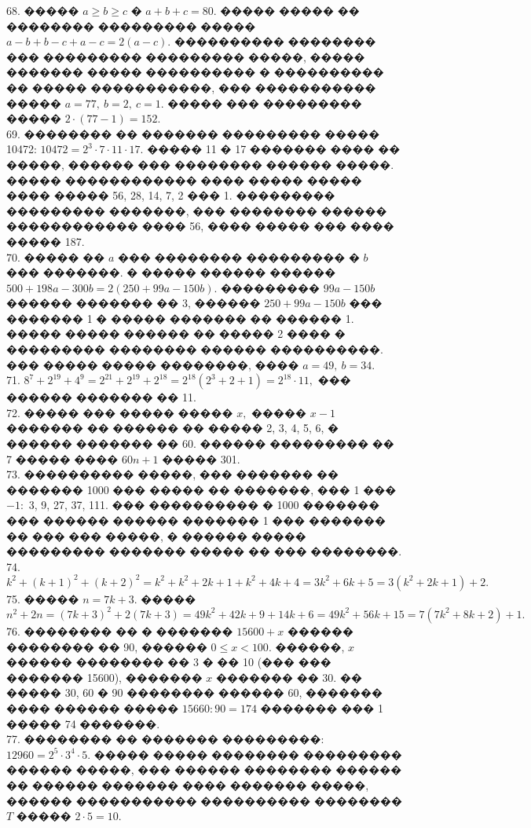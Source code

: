 \documentclass[12pt]{article}
\begin{document}
68. ����� $a\geqslant b\geqslant c$ � $a+b+c=80.$ ����� ����� �� �������� ��������� ����� $a-b+b-c+a-c=2(a-c).$ ���������� �������� ��� ��������� ��������� �����, ����� ������� ����� ���������� � ���������� �� ����� �����������, ��� ����������� ����� $a=77,\ b=2,\ c=1.$ ����� ��� ��������� ����� $2\cdot(77-1)=152.$\\
69. �������� �� ������� ��������� ����� 10472: $10472=2^3\cdot7\cdot11\cdot17.$ ����� 11 � 17 ������� ���� �� �����, ������ ��� �������� ������ �����. ����� ������������ ���� ����� ����� ���� ����� 56, 28, 14, 7, 2 ��� 1. ��������� ��������� �������, ��� �������� ������ ������������ ���� 56, ���� ����� ��� ���� ����� 187.\\
70. ����� �� $a$ ��� �������� ��������� � $b$ ��� �������. � ����� ������ ������ $500+198a-300b=2(250+99a-150b).$ ��������� $99a-150b$ ������ ������� �� 3, ������
$250+99a-150b$ ��� ������� 1 � ����� ������� �� ������ 1. ����� ����� ������ �� ����� 2 ���� � ��������� �������� ������ ����������. ��� ����� ����� ��������, ���� $a=49,\ b=34.$\\
71. $8^7+2^{19}+4^9=2^{21}+2^{19}+2^{18}=2^{18}(2^3+2+1)=2^{18}\cdot11,$ ��� ������ ������� �� 11.\\
72. ����� ��� ����� ����� $x,$ ����� $x-1$ ������� �� ������ �� ����� 2, 3, 4, 5, 6, � ������ ������� �� 60. ������ ��������� �� 7 ����� ���� $60n+1$ ����� 301.\\
73. ���������� �����, ��� ������� �� ������� 1000 ��� ����� �� �������, ��� 1 ��� $-1:$ 3, 9, 27, 37, 111. ��� ���������� � 1000 ������� ��� ������ ������ ������� 1 ��� ������� �� ��� ��� �����, � ������ ����� ��������� ������� ����� �� ��� ��������.\\
74. $k^2+(k+1)^2+(k+2)^2=k^2+k^2+2k+1+k^2+4k+4=3k^2+6k+5=3(k^2+2k+1)+2.$\\
75. ����� $n=7k+3.$ ����� $n^2+2n=(7k+3)^2+2(7k+3)=49k^2+42k+9+14k+6=49k^2+56k+15=7(7k^2+8k+2)+1.$\\
76. �������� �� � ������� $15600+x$ ������ �������� �� 90, ������ $0\leqslant x <100.$ ������, $x$ ������ �������� �� 3 � �� 10 (��� ��� ������� 15600), ������� $x$ ������� �� 30. �� ����� 30, 60 � 90 �������� ������ 60, ������� ���� ������ ����� $15660:90=174$ ������� ��� 1 ����� 74 �������.\\
77. �������� �� ������� ���������: $12960=2^5\cdot3^4\cdot5.$ ����� ����� �������� ��������� ������ �����, ��� ������ �������� ������ �� ������ ������� ���� ������� �����, ������ ����������� ���������� �������� $T$ ����� $2\cdot5=10.$\\
\end{document}
